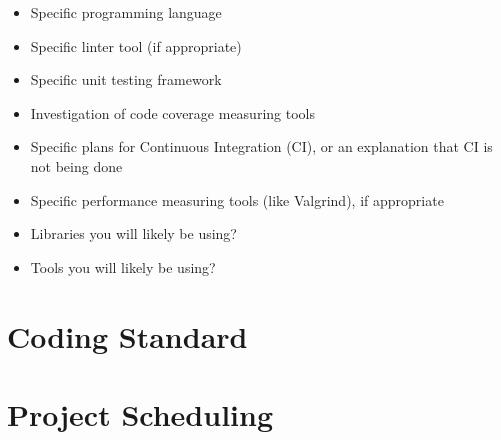 \documentclass{article}
\begin{document}
\begin{itemize}
\item Specific programming language
\item Specific linter tool (if appropriate)
\item Specific unit testing framework
\item Investigation of code coverage measuring tools
\item Specific plans for Continuous Integration (CI), or an explanation that CI
  is not being done
\item Specific performance measuring tools (like Valgrind), if
  appropriate
\item Libraries you will likely be using?
\item Tools you will likely be using?
\end{itemize}

\section{Coding Standard}

\section{Project Scheduling}

\end{document}
